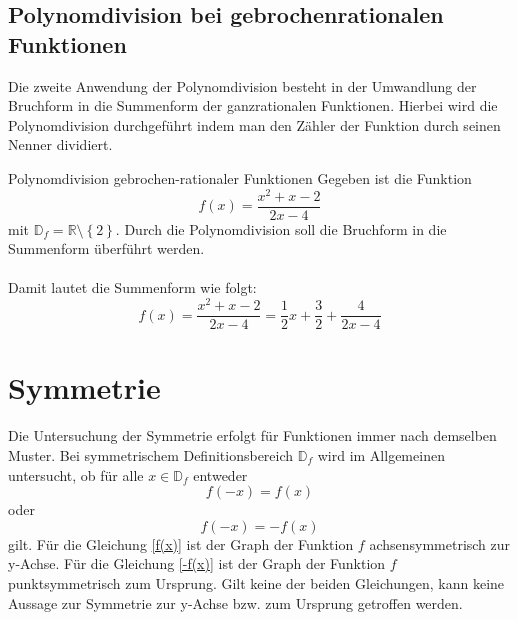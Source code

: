 \subsection{Polynomdivision bei gebrochenrationalen Funktionen}\label{polynomdivisionBruch}
Die zweite Anwendung der Polynomdivision besteht in der Umwandlung der Bruchform in die Summenform der ganzrationalen Funktionen. Hierbei wird die Polynomdivision durchgeführt indem man den Zähler der Funktion durch seinen Nenner dividiert.
\begin{bsp}{Polynomdivision gebrochen-rationaler Funktionen}{}
Gegeben ist die Funktion $$f(x)=\dfrac{x^2+x-2}{2x-4}$$ mit $\mathds{D}_f=\mathds{R}\setminus \left\{ 2 \right\}$. Durch die Polynomdivision soll die Bruchform in die Summenform überführt werden.\\
\\
Damit lautet die Summenform wie folgt:
$$f(x)=\dfrac{x^2+x-2}{2x-4} = \dfrac{1}{2} x +\dfrac{3}{2} +\dfrac{4}{2x-4} $$
\end{bsp}
\section{Symmetrie} 
Die Untersuchung der Symmetrie erfolgt für Funktionen immer nach demselben Muster. Bei symmetrischem Definitionsbereich $\mathds{D}_f$ wird im Allgemeinen untersucht, ob für alle $x\in\mathds{D}_f$ entweder \begin{equation}\label{f(x)}
    f(-x) = f(x)
\end{equation} oder 
\begin{equation} \label{-f(x)}
f(-x) = -f(x) 
\end{equation} gilt. Für die Gleichung \eqref{f(x)} ist der Graph der Funktion $f$ achsensymmetrisch zur y-Achse. Für die Gleichung \eqref{-f(x)} ist der Graph der Funktion $f$ punktsymmetrisch zum Ursprung. Gilt keine der beiden Gleichungen, kann keine Aussage zur Symmetrie zur y-Achse bzw. zum Ursprung getroffen werden. 
\begin{center}
\end{center}
